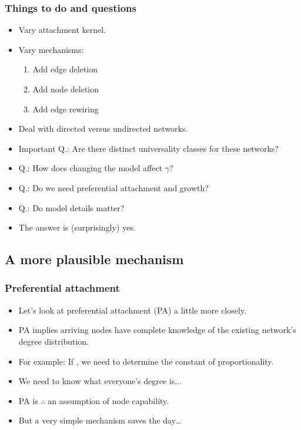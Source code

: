 \begin{frame}[label=]
 \frametitle{Things to do and questions}  

 \begin{itemize}
 \item<1-> Vary attachment kernel.
 \item<2-> Vary mechanisms:
   \begin{enumerate}
   \item<3-> Add edge deletion
   \item<4-> Add node deletion
   \item<5-> Add edge rewiring
   \end{enumerate}
 \item<6-> Deal with directed versus undirected networks.
 \item<7-> \alert{Important Q.}:
   Are there distinct universality classes for these networks?  
 \item<8->
   \alert{Q.}:
   How does changing the model affect $\gamma$?
 \item<9->
   \alert{Q.}:
   Do we need preferential attachment and growth?
 \item<10->
   \alert{Q.}:
   Do model details matter?
 \item<11->
   The answer is (surprisingly) \alert{yes}.
 \end{itemize}

\end{frame}

\subsection{A more plausible mechanism}

\begin{frame}[label=]
 \frametitle{Preferential attachment}  
 
 \begin{itemize}
 \item<1-> 
   Let's look at preferential attachment \alert{(PA)}
   a little more closely.
 \item<2-> 
   PA implies arriving nodes have \alert{complete knowledge}
   of the existing network's degree distribution.
 \item<3->
   For example: If , we need to determine
   the constant of proportionality.
 \item<4->
   We need to know what everyone's degree is...
 \item<5->
   PA is $\therefore$ an  assumption of
   node capability.
 \item<6->
   But a \alert{very simple mechanism} saves the day\ldots
 \end{itemize}

\end{frame}

